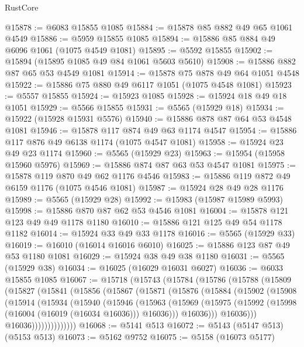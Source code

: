 \begin{lexlean}{RustCore}
\begin{coremodule}
@15878 := @6083 @15855 @1085
@15884 := @15878 @85 @882 @49 @65 @1061 @4549
@15886 := @5959 @15855 @1085
@15894 := @15886 @85 @884 @49 @6096 @1061 (@1075 @4549 @1081)
@15895 := @5592 @15855
@15902 := @15894 (@15895 @1085 @49 @84 @1061 @5603 @5610)
@15908 := @15886 @882 @87 @65 @53 @4549 @1081
@15914 := @15878 @75 @878 @49 @64 @1051 @4548
@15922 := @15886 @75 @880 @49 @6117 @1051 (@1075 @4548 @1081)
@15923 := @5557 @15855
@15924 := @15923 @1085
@15928 := @15924 @18 @49 @18 @1051
@15929 := @5566 @15855
@15931 := @5565 (@15929 @18)
@15934 := @15922 (@15928 @15931 @5576)
@15940 := @15886 @878 @87 @64 @53 @4548 @1081
@15946 := @15878 @117 @874 @49 @63 @1174 @4547
@15954 := @15886 @117 @876 @49 @6138 @1174 (@1075 @4547 @1081)
@15958 := @15924 @23 @49 @23 @1174
@15960 := @5565 (@15929 @23)
@15963 := @15954 (@15958 @15960 @5976)
@15969 := @15886 @874 @87 @63 @53 @4547 @1081
@15975 := @15878 @119 @870 @49 @62 @1176 @4546
@15983 := @15886 @119 @872 @49 @6159 @1176 (@1075 @4546 @1081)
@15987 := @15924 @28 @49 @28 @1176
@15989 := @5565 (@15929 @28)
@15992 := @15983 (@15987 @15989 @5993)
@15998 := @15886 @870 @87 @62 @53 @4546 @1081
@16004 := @15878 @121 @123 @49 @49 @1178 @1180
@16010 := @15886 @121 @125 @49 @54 @1178 @1182
@16014 := @15924 @33 @49 @33 @1178
@16016 := @5565 (@15929 @33)
@16019 := @16010 (@16014 @16016 @6010)
@16025 := @15886 @123 @87 @49 @53 @1180 @1081
@16029 := @15924 @38 @49 @38 @1180
@16031 := @5565 (@15929 @38)
@16034 := @16025 (@16029 @16031 @6027)
@16036 := @6033 @15855 @1085
@16067 := @15718
    (@15743
      (@15784
        (@15786
          (@15788
            (@15809
              (@15827
                (@15841
                  (@15856
                    (@15867
                      (@15871
                        (@15876
                          (@15884
                            (@15902
                              (@15908
                                (@15914
                                  (@15934
                                    (@15940
                                      (@15946
                                        (@15963
                                          (@15969
                                            (@15975
                                              (@15992
                                                (@15998 (@16004 (@16019 (@16034 @16036))) @16036)))
                                            @16036)))
                                      @16036)))
                                @16036))))))))))))))
@16068 := @5141 @513
@16072 := @5143 (@5147 @513) (@5153 @513)
@16073 := @5162 @9752
@16075 := @5158 (@16073 @5177)

\end{coremodule}
\end{lexlean}
